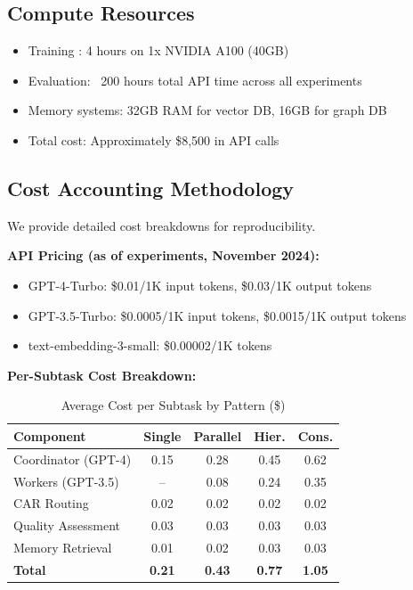 \documentclass{article}
\theoremstyle{plain}
\theoremstyle{definition}
\theoremstyle{remark}
\begin{document}
\subsection{Compute Resources}

\begin{itemize}[nosep]
	\item Training \car{}: 4 hours on 1x NVIDIA A100 (40GB)
	\item Evaluation: ~200 hours total API time across all experiments
	\item Memory systems: 32GB RAM for vector DB, 16GB for graph DB
	\item Total cost: Approximately \$8,500 in API calls
\end{itemize}

\subsection{Cost Accounting Methodology}
\label{app:cost}

We provide detailed cost breakdowns for reproducibility.

\textbf{API Pricing (as of experiments, November 2024):}
\begin{itemize}[nosep]
	\item GPT-4-Turbo: \$0.01/1K input tokens, \$0.03/1K output tokens
	\item GPT-3.5-Turbo: \$0.0005/1K input tokens, \$0.0015/1K output tokens
	\item text-embedding-3-small: \$0.00002/1K tokens
\end{itemize}

\textbf{Per-Subtask Cost Breakdown:}
\begin{table}[H]
	\centering
	\caption{Average Cost per Subtask by Pattern (\$)}
	\small
	\begin{tabular}{@{}lcccc@{}}
		\toprule
		\textbf{Component} & \textbf{Single} & \textbf{Parallel} & \textbf{Hier.} & \textbf{Cons.} \\
		\midrule
		Coordinator (GPT-4) & 0.15 & 0.28 & 0.45 & 0.62 \\
		Workers (GPT-3.5) & -- & 0.08 & 0.24 & 0.35 \\
		CAR Routing & 0.02 & 0.02 & 0.02 & 0.02 \\
		Quality Assessment & 0.03 & 0.03 & 0.03 & 0.03 \\
		Memory Retrieval & 0.01 & 0.02 & 0.03 & 0.03 \\
		\midrule
		\textbf{Total} & \textbf{0.21} & \textbf{0.43} & \textbf{0.77} & \textbf{1.05} \\
		\bottomrule
	\end{tabular}
\end{table}
\end{document}
